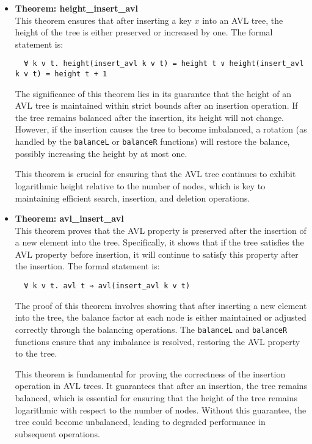 \documentclass[12pt]{article}
\begin{document}
\begin{itemize}
  \item \textbf{Theorem: height\_insert\_avl} \\
  This theorem ensures that after inserting a key \( x \) into an AVL tree, the height of the tree is either preserved or increased by one. The formal statement is:
  \begin{verbatim}
  ∀ k v t. height(insert_avl k v t) = height t ∨ height(insert_avl k v t) = height t + 1
  \end{verbatim}
  The significance of this theorem lies in its guarantee that the height of an AVL tree is maintained within strict bounds after an insertion operation. If the tree remains balanced after the insertion, its height will not change. However, if the insertion causes the tree to become imbalanced, a rotation (as handled by the \texttt{balanceL} or \texttt{balanceR} functions) will restore the balance, possibly increasing the height by at most one.

  This theorem is crucial for ensuring that the AVL tree continues to exhibit logarithmic height relative to the number of nodes, which is key to maintaining efficient search, insertion, and deletion operations.

  \item \textbf{Theorem: avl\_insert\_avl} \\
  This theorem proves that the AVL property is preserved after the insertion of a new element into the tree. Specifically, it shows that if the tree satisfies the AVL property before insertion, it will continue to satisfy this property after the insertion. The formal statement is:
  \begin{verbatim}
  ∀ k v t. avl t ⇒ avl(insert_avl k v t)
  \end{verbatim}
  The proof of this theorem involves showing that after inserting a new element into the tree, the balance factor at each node is either maintained or adjusted correctly through the balancing operations. The \texttt{balanceL} and \texttt{balanceR} functions ensure that any imbalance is resolved, restoring the AVL property to the tree.

  This theorem is fundamental for proving the correctness of the insertion operation in AVL trees. It guarantees that after an insertion, the tree remains balanced, which is essential for ensuring that the height of the tree remains logarithmic with respect to the number of nodes. Without this guarantee, the tree could become unbalanced, leading to degraded performance in subsequent operations.


\end{itemize}
\end{document}
